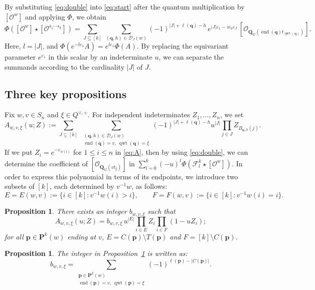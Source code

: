 \documentclass[11pt,a4paper,reqno]{amsart}
\DeclareRobustCommand{\rev}[1]{{\color{revision}#1}}
\newenvironment{revisiontext}{\par\begingroup\color{revision}}{\par\endgroup}
\numberwithin{equation}{section}
\newtheorem{proposition}[theorem]{Proposition}
\theoremstyle{definition}
\DeclareMathOperator{\End}{end}
\DeclareMathOperator{\qwt}{qwt}
\newcommand{\QG}{\mathbf Q_G}
\newcommand{\OO}{\mathcal O}
\newcommand{\Sc}[1]{[\OO^{#1}]}
\newcommand{\Si}[1]{[\OO_{\QG(#1)}]}
\newcommand{\Pieri}{\mathbf P}
\newcommand{\pp}{\mathbf p}
\newcommand{\qq}{\mathbf q}
\newcommand{\eps}{\varepsilon}
\newcommand{\FF}{\mathcal F}
\begin{document}
\begin{revisiontext}
By substituting \eqref{eq:double} into \eqref{eq:start} after the quantum multiplication by \(\Sc{w}\) and applying \(\Phi\), we obtain 
\[
 \Phi(\Sc{w}\star\Sc{s_1\cdots s_k})
 =\sum_{J\subseteq[k]}\ \sum_{(\qq,h)\in\mathcal D_J(w)}
 (-1)^{|J|+\ell(\qq)-h}\,
 e^{|J|\eps_1-w_h\eps_J}\,
 \Si{\End(\qq)t_{\qwt(\qq)}} .
\]
Here, \(l=|J|\), and \(\Phi(e^{-l\eps_1}A)=e^{l\eps_1}\Phi(A)\). By replacing the equivariant parameter \(e^{\eps_1}\) in this scalar by an indeterminate \(u\),
we can separate the summands according to the cardinality \(|J|\) of \(J\).
\end{revisiontext}

\subsection{Three key propositions}
\rev{Fix \(w,v\in S_n\) and \(\xi\in Q^{\vee,+}\). For independent indeterminates \(Z_1,\ldots,Z_n\), we set}
\begin{equation}\label{eq:A}
 A_{w,v,\xi}(u;Z) :=
 \sum_{J\subseteq[k]}\ 
 \sum_{\substack{(\qq,h)\in\mathcal D_J(w)\\
                  \End(\qq)=v,\ \qwt(\qq)=\xi}}
 (-1)^{|J|+\ell(\qq)-h}u^{|J|}
 \prod_{j\in J} Z_{B_{\qq,h}(j)} .
\end{equation}
If we put \(Z_i=e^{-\eps_{w(i)}}\) for \(1 \le i \le n\) in \eqref{eq:A}, then by using \eqref{eq:double}, we can determine the coefficient of \(\Si{vt_\xi}\) in \(\sum_{l=0}^{k} (-u)^l\Phi(\FF^k_l\star\Sc{w})\).
\rev{In order to express this polynomial in terms of its endpoints, we introduce two subsets of \([k]\), each determined by \(v^{-1}w\), as follows:}
\begin{equation}\label{eq:EF}
 E=E(w,v):=\{i\in[k]:v^{-1}w(i)>i\},\qquad
 F=F(w,v):=\{i\in[k]:v^{-1}w(i)=i\}.
\end{equation}

\begin{proposition}\label{prop:factor}
There exists an integer \(b_{w,v,\xi}\) such that
\begin{equation}\label{eq:factor}
 A_{w,v,\xi}(u;Z)=b_{w,v,\xi}\,u^{|E|}
       \prod_{i\in E} Z_i\prod_{i\in F}(1-uZ_i);
\end{equation}
for all \(\pp\in\Pieri^k(w)\) ending at \(v\),
\(E=C(\pp)\setminus T(\pp)\) and \(F=[k]\setminus C(\pp)\).
\end{proposition}

\begin{proposition}\label{prop:integer}
The integer in Proposition~\ref{prop:factor} is written as: 
\begin{equation}\label{eq:integer}
 b_{w,v,\xi}=
 \sum_{\substack{\pp\in\Pieri^k(w)\\
                 \End(\pp)=v,\ \qwt(\pp)=\xi}}(-1)^{\ell(\pp)-|C(\pp)|}.
\end{equation}
\end{proposition}
\end{document}
